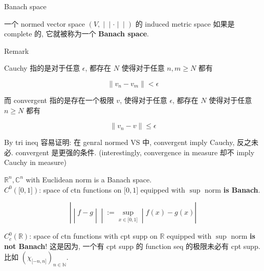\documentclass{qlnotes-export}
\begin{document}
\begin{definition}{Banach space}\label{def-09-l-p-space-and-inequalities-banach-space}

一个 normed vector space \(\left. (V, \middle| \middle| \cdot \middle| \middle| ) \right.\) 的 induced metric space 如果是 complete 的, 它就被称为一个 \textbf{Banach space}.\\

\end{definition}

\begin{qlremark}{Remark}

Cauchy 指的是对于任意 \(\epsilon\), 都存在 \(N\) 使得对于任意 \(n,m \geq N\) 都有

\[\parallel v_{n} - v_{m} \parallel < \epsilon\]

而 convergent 指的是存在一个极限 \(v\), 使得对于任意 \(\epsilon\), 都存在 \(N\) 使得对于任意 \(n \geq N\) 都有

\[\parallel v_{n} - v \parallel \leq \epsilon\]

By tri ineq 容易证明: 在 genral normed VS 中, convergent imply Cauchy, 反之未必. convergent 是更强的条件. (interestingly, convergence in measure 却不 imply Cauchy in measure)

\end{qlremark}

\begin{example}\label{ex-09-l-p-space-and-inequalities-example-001}

\({\mathbb{R}}^{n},{\mathbb{C}}^{n}\) with Euclidean norm is a Banach space.\\
\(C^{0}(\lbrack 0,1\rbrack)\): space of ctn functions on \(\lbrack 0,1\rbrack\) equipped with \(\sup\) norm \textbf{is Banach}.

\[\left. | \middle| f - g \middle| \middle| := \sup\limits_{x \in \lbrack 0,1\rbrack} \middle| f(x) - g(x)| \right.\]

\(C_{c}^{0}({\mathbb{R}})\): space of ctn functions with cpt supp on \(\mathbb{R}\) equipped with \(\sup\) norm \textbf{is not Banach}! 这是因为, 一个有 cpt supp 的 function seq 的极限未必有 cpt supp. 比如 \((\chi_{\lbrack - n,n\rbrack})_{n \in {\mathbb{N}}}\).

\end{example}
\end{document}
